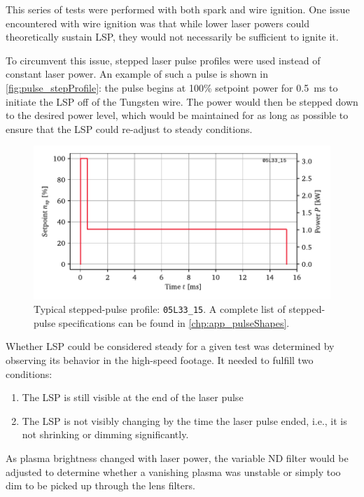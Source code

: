             This series of tests were performed with both spark and wire ignition. One issue encountered with wire ignition was that while lower laser powers could theoretically sustain LSP, they would not necessarily be sufficient to ignite it. 
            
            To circumvent this issue, stepped laser pulse profiles were used instead of constant laser power. An example of such a pulse is shown in \autoref{fig:pulse_stepProfile}: the pulse begins at 100\% setpoint power for \qty{0.5}{ms} to initiate the LSP off of the Tungsten wire. The power would then be stepped down to the desired power level, which would be maintained for as long as possible to ensure that the LSP could re-adjust to steady conditions.

            \begin{figure}[h]
                \centering
                \includegraphics[]{assets/5 results/pulse_profile}
                \caption[Typical stepped-pulse profile: \texttt{05L33\_15}]{Typical stepped-pulse profile: \texttt{05L33\_15}. A complete list of stepped-pulse specifications can be found in \autoref{chp:app_pulseShapes}.}
                \label{fig:pulse_stepProfile}
            \end{figure}

            Whether LSP could be considered steady for a given test was determined by observing its behavior in the high-speed footage. It needed to fulfill two conditions:
            \begin{enumerate}
                \item The LSP is still visible at the end of the laser pulse
                \item The LSP is not visibly changing by the time the laser pulse ended, i.e., it is not shrinking or dimming significantly.
            \end{enumerate}
            As plasma brightness changed with laser power, the variable ND filter would be adjusted to determine whether a vanishing plasma was unstable or simply too dim to be picked up through the lens filters.

